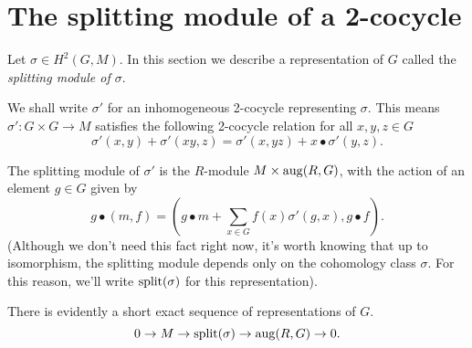 





\section{The splitting module of a 2-cocycle}

Let $\sigma \in H^2(G,M)$.
In this section we describe a representation of $G$ called the \emph{splitting module of $\sigma$}.

We shall write $\sigma'$ for an inhomogeneous 2-cocycle representing $\sigma$.
This means $\sigma' : G \times G \to M$ satisfies the following 2-cocycle
relation for all $x,y,z\in G$
\begin{equation}
	\label{def:2-cocycle relation}
	\sigma'(x,y) + \sigma'(xy,z) = \sigma'(x,yz) + x \bullet \sigma'(y,z).
\end{equation}


\begin{definition} \label{def:splitting module}
	The splitting module of $\sigma'$ is the $R$-module $M \times \mathrm{aug}(R,G)$,
	with the action of an element $g \in G$ given by
	\[
		g \bullet (m,f)
		= \left(g \bullet m + \sum_{x \in G} f(x) \sigma'(g,x) , g \bullet f\right).
	\]
	(Although we don't need this fact right now, it's worth knowing that up to isomorphism,
	the splitting module depends only on the cohomology class $\sigma$. For this reason, we'll write
	$\mathrm{split}(\sigma)$ for this representation).
\end{definition}

There is evidently a short exact sequence of representations of $G$.
\begin{equation}\label{eq:split ses}
	0 \to M \to \mathrm{split}(\sigma) \to \mathrm{aug}(R,G) \to 0.
\end{equation}

